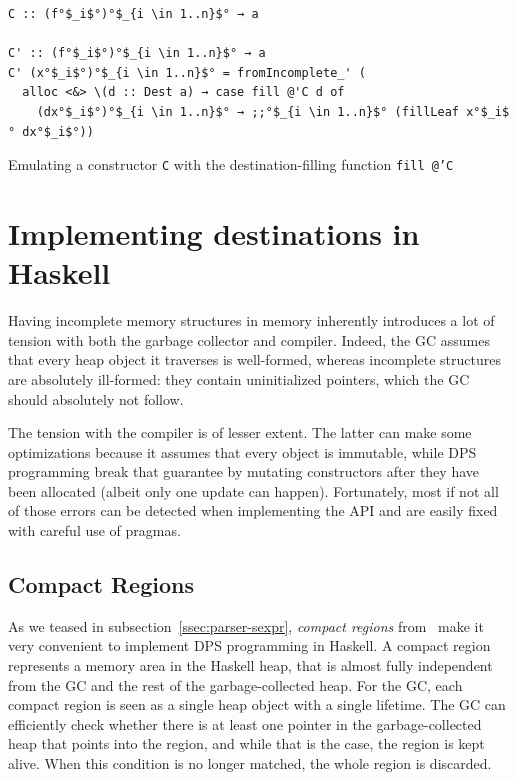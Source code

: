 \documentclass[english]{jflart}
\begin{document}
\begin{table}[t]
\small
\begin{verbatim}
C :: (f°$_i$°)°$_{i \in 1..n}$° → a

C' :: (f°$_i$°)°$_{i \in 1..n}$° → a
C' (x°$_i$°)°$_{i \in 1..n}$° = fromIncomplete_' (
  alloc <&> \(d :: Dest a) → case fill @'C d of
    (dx°$_i$°)°$_{i \in 1..n}$° → ;;°$_{i \in 1..n}$° (fillLeaf x°$_i$° dx°$_i$°))
\end{verbatim}
\caption{Emulating a constructor \texttt{C} with the destination-filling function \texttt{fill @'C}}
\label{table:emulate-ctor}
\end{table}

\section{Implementing destinations in Haskell}\label{sec:implementation}

Having incomplete memory structures in memory inherently introduces a lot of tension with both the garbage collector and compiler. Indeed, the GC assumes that every heap object it traverses is well-formed, whereas incomplete structures are absolutely ill-formed: they contain uninitialized pointers, which the GC should absolutely not follow.

The tension with the compiler is of lesser extent. The latter can make some optimizations because it assumes that every object is immutable, while DPS programming break that guarantee by mutating constructors after they have been allocated (albeit only one update can happen). Fortunately, most if not all of those errors can be detected when implementing the API and are easily fixed with careful use of pragmas.

\subsection{Compact Regions}\label{ssec:impl-compact-regions}

As we teased in subsection~\ref{ssec:parser-sexpr}, \emph{compact regions} from~\cite{yang_efficient_2015} make it very convenient to implement DPS programming in 
Haskell. A compact region represents a memory area in the Haskell heap, that is almost fully independent from the GC and the rest of the garbage-collected heap. For the GC, each compact region is seen as a single heap object with a single lifetime. The GC can efficiently check whether there is at least one pointer in the garbage-collected heap that points into the region, and while that is the case, the region is kept alive. When this condition is no longer matched, the whole region is discarded.
\end{document}
